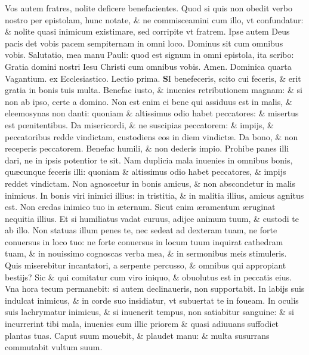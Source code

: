 \documentclass[a5paper,10pt]{book}
\def\rightmarginnote{%
	\lrmarginnote{\hskip\columnwidth \hskip -1em}}
\def\ae{æ}
\def\oe{œ}
\begin{document}
\begin{multicols*}{2}
Vos autem fratres, nolite deficere benefacientes. Quod si quis non obedit verbo nostro per epistolam, hunc notate, \& ne commisceamini cum illo, vt confundatur: \& nolite quasi inimicum existimare, sed corripite vt fratrem.
Ipse autem Deus pacis det vobis pacem sempiternam in omni loco. Dominus sit cum omnibus vobis. Salutatio, mea manu Pauli: quod est signum in omni epistola, ita scribo: Gratia domini nostri Iesu Christi cum omnibus vobis. Amen.
\newline {} \color{red} \hypertarget{SUN-QVARTA-VAGAN}{Dominica} quarta Vagantium. ex Ecclesiastico. \quad Lectio prima. \color{black}
\vspace{-1.25em}
\lettrine[lines=2]{\bfseries S}{}I\rightmarginnote{c. 12.} benefeceris, scito cui feceris, \& erit gratia in bonis tuis multa.
Benefac iusto, \& inuenies retributionem magnam: \& si non ab ipso, certe a domino. Non est enim ei bene qui assiduus est in malis, \& eleemosynas non danti: quoniam \& altissimus odio habet peccatores: \& misertus est p\oe nitentibus.
Da misericordi,
\& ne suscipias peccatorem: \& impijs, \& peccatoribus redde vindictam, custodiens eos in diem vindict\ae . Da bono, \& non receperis peccatorem.
Benefac humili, \& non dederis impio. Prohibe panes illi dari, ne in ipsis potentior te sit. Nam duplicia mala inuenies in omnibus bonis, qu\ae cunque feceris illi: quoniam \& altissimus odio habet peccatores, \& impijs reddet vindictam.
Non agnoscetur in bonis amicus, \& non abscondetur in malis inimicus. In bonis viri inimici illius: in tristitia, \& in malitia illius, amicus agnitus est.
Non credas inimico tuo in \ae ternum. Sicut enim \ae ramentum \ae ruginat nequitia illius.
Et si humiliatus vadat curuus, adijce animum tuum, \& custodi te ab illo. Non statuas illum penes te, nec sedeat ad dexteram tuam, ne forte conuersus in loco tuo: ne forte conuersus in locum tuum inquirat cathedram tuam, \& in nouissimo cognoscas verba mea, \& in sermonibus meis stimuleris.
Quis miserebitur incantatori, a serpente percusso, \& omnibus qui appropiant bestijs? Sic \& qui comitatur cum viro iniquo, \& obuolutus est in peccatis eius.
Vna hora tecum permanebit: si autem declinaueris, non supportabit. In labijs suis indulcat inimicus, \& in corde suo insidiatur, vt subuertat te in foueam.
In oculis suis lachrymatur inimicus, \& si inuenerit tempus, non satiabitur sanguine: \& si incurrerint tibi mala, inuenies eum illic priorem \& quasi adiuuans suffodiet plantas tuas.
Caput suum mouebit, \& plaudet manu: \& multa susurrans commutabit vultum suum.

\end{multicols*}
\end{document}

